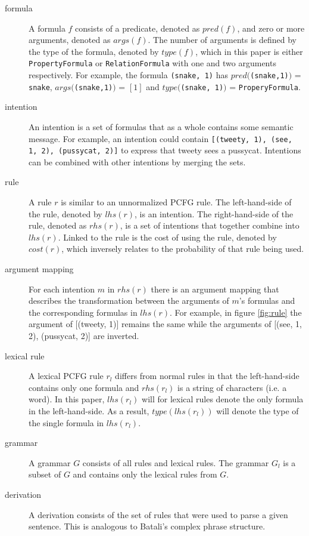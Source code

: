 \documentclass[a4paper]{article}
\begin{document}
\begin{description}
    \item[formula] A formula $f$ consists of a predicate, denoted as $pred(f)$, and zero or more arguments, denoted as $args(f)$. The number of arguments is defined by the type of the formula, denoted by $type(f)$, which in this paper is either \verb|PropertyFormula| or \verb|RelationFormula| with one and two arguments respectively. For example, the formula \verb|(snake, 1)| has $pred($\verb|(snake,1)|$)$ = \verb|snake|, $args($\verb|(snake,1)|$)$ = $[1]$ and $type($\verb|(snake, 1)|$)$ = \verb|ProperyFormula|.
    \item[intention] An intention is a set of formulas that as a whole contains some semantic message. For example, an intention could contain \verb|[(tweety, 1), (see, 1, 2), (pussycat, 2)]| to express that tweety sees a pussycat. Intentions can be combined with other intentions by merging the sets.
    \item[rule] A rule $r$ is similar to an unnormalized PCFG rule. The left-hand-side of the rule, denoted by $lhs(r)$, is an intention. The right-hand-side of the rule, denoted as $rhs(r)$, is a set of intentions that together combine into $lhs(r)$. Linked to the rule is the cost of using the rule, denoted by $cost(r)$, which inversely relates to the probability of that rule being used.
    \item[argument mapping] For each intention $m$ in $rhs(r)$ there is an argument mapping that describes the transformation between the arguments of $m$'s formulas and the corresponding formulas in $lhs(r)$. For example, in figure \ref{fig:rule} the argument of [(tweety, 1)] remains the same while the arguments of [(see, 1, 2),  (pussycat, 2)] are inverted.
    \item[lexical rule] A lexical PCFG rule $r_l$ differs from normal rules in that the left-hand-side contains only one formula and $rhs(r_l)$ is a string of characters (i.e. a word). In this paper, $lhs(r_l)$ will for lexical rules denote the only formula in the left-hand-side. As a result, $type(lhs(r_l))$ will denote the type of the single formula in $lhs(r_l)$.
    \item[grammar] A grammar $G$ consists of all rules and lexical rules. The grammar $G_l$ is a subset of $G$ and contains only the lexical rules from $G$.
\item[derivation] A derivation consists of the set of rules that were used to parse a given sentence. This is analogous to Batali's complex phrase structure.
\end{description}
\end{document}
